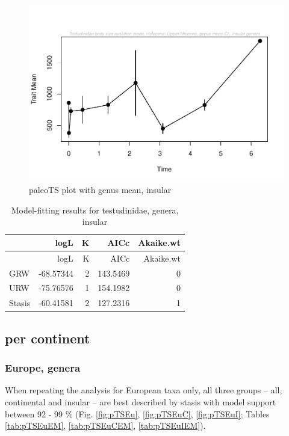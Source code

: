 \begin{figure}[H]
	\centering
	\includegraphics{MA_JJ_files/figure-latex/paleoTSI-1.pdf}
	\caption{paleoTS plot with genus mean, insular}
	\label{fig:pTSI}
\end{figure}

\begin{longtable}[]{@{}lrrrr@{}}
	\caption{Model-fitting results for testudinidae, genera,
		insular}
	\label{tab:pTSIEM}\tabularnewline
	\toprule
	& logL & K & AICc & Akaike.wt\tabularnewline
	\midrule
	\endfirsthead
	\toprule
	& logL & K & AICc & Akaike.wt\tabularnewline
	\midrule
	\endhead
	GRW & -68.57344 & 2 & 143.5469 & 0\tabularnewline
	URW & -75.76576 & 1 & 154.1982 & 0\tabularnewline
	Stasis & -60.41581 & 2 & 127.2316 & 1\tabularnewline
	\bottomrule
\end{longtable}

\FloatBarrier

\subsection{per continent}\label{per-continent}

\subsubsection{Europe, genera}\label{europe-genera}

When repeating the analysis for European taxa only, all three groups -- all, continental and insular -- are best described by stasis with model support between 92 - 99 \% (Fig. \ref{fig:pTSEu}, \ref{fig:pTSEuC}, \ref{fig:pTSEuI}; Tables \ref{tab:pTSEuEM}, \ref{tab:pTSEuCEM}, \ref{tab:pTSEuIEM}).

